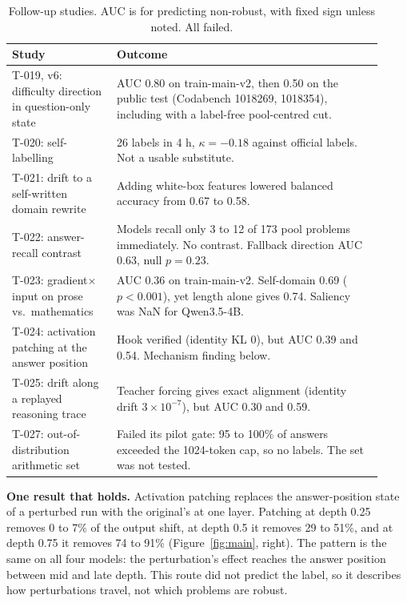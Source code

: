 \documentclass{article}
\begin{document}
\begin{table}[h]
\centering
\small
\caption{Follow-up studies. AUC is for predicting non-robust, with fixed sign unless noted. All failed.}
\label{tab:negative}
\begin{tabular}{p{0.26\linewidth}p{0.66\linewidth}}
\toprule
Study & Outcome \\
\midrule
T-019, v6: difficulty direction in question-only state & AUC 0.80 on train-main-v2, then 0.50 on the public test (Codabench 1018269, 1018354), including with a label-free pool-centred cut. \\
T-020: self-labelling & 26 labels in 4 h, $\kappa=-0.18$ against official labels. Not a usable substitute. \\
T-021: drift to a self-written domain rewrite & Adding white-box features lowered balanced accuracy from 0.67 to 0.58. \\
T-022: answer-recall contrast & Models recall only 3 to 12 of 173 pool problems immediately. No contrast. Fallback direction AUC 0.63, null $p=0.23$. \\
T-023: gradient$\times$input on prose vs.\ mathematics & AUC 0.36 on train-main-v2. Self-domain 0.69 ($p<0.001$), yet length alone gives 0.74. Saliency was NaN for Qwen3.5-4B. \\
T-024: activation patching at the answer position & Hook verified (identity KL 0), but AUC 0.39 and 0.54. Mechanism finding below. \\
T-025: drift along a replayed reasoning trace & Teacher forcing gives exact alignment (identity drift $3\times10^{-7}$), but AUC 0.30 and 0.59. \\
T-027: out-of-distribution arithmetic set & Failed its pilot gate: 95 to 100\% of answers exceeded the 1024-token cap, so no labels. The set was not tested. \\
\bottomrule
\end{tabular}
\end{table}

\textbf{One result that holds.} Activation patching \cite{pathpatching} replaces the answer-position state of a perturbed run with the original's at one layer. Patching at depth 0.25 removes 0 to 7\% of the output shift, at depth 0.5 it removes 29 to 51\%, and at depth 0.75 it removes 74 to 91\% (Figure~\ref{fig:main}, right). The pattern is the same on all four models: the perturbation's effect reaches the answer position between mid and late depth. This route did not predict the label, so it describes how perturbations travel, not which problems are robust.
\end{document}
